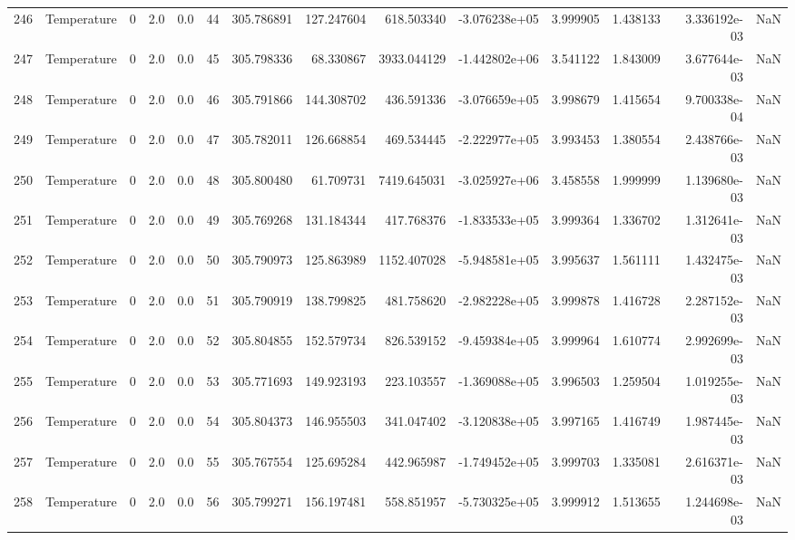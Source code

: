 \begin{tabular}{llrrrrrrrrrrrr}
246 &  Temperature &       0 &  2.0 &  0.0 &   44 &  305.786891 &   127.247604 &     618.503340 & -3.076238e+05 &  3.999905 &  1.438133 &  3.336192e-03 &      NaN \\
247 &  Temperature &       0 &  2.0 &  0.0 &   45 &  305.798336 &    68.330867 &    3933.044129 & -1.442802e+06 &  3.541122 &  1.843009 &  3.677644e-03 &      NaN \\
248 &  Temperature &       0 &  2.0 &  0.0 &   46 &  305.791866 &   144.308702 &     436.591336 & -3.076659e+05 &  3.998679 &  1.415654 &  9.700338e-04 &      NaN \\
249 &  Temperature &       0 &  2.0 &  0.0 &   47 &  305.782011 &   126.668854 &     469.534445 & -2.222977e+05 &  3.993453 &  1.380554 &  2.438766e-03 &      NaN \\
250 &  Temperature &       0 &  2.0 &  0.0 &   48 &  305.800480 &    61.709731 &    7419.645031 & -3.025927e+06 &  3.458558 &  1.999999 &  1.139680e-03 &      NaN \\
251 &  Temperature &       0 &  2.0 &  0.0 &   49 &  305.769268 &   131.184344 &     417.768376 & -1.833533e+05 &  3.999364 &  1.336702 &  1.312641e-03 &      NaN \\
252 &  Temperature &       0 &  2.0 &  0.0 &   50 &  305.790973 &   125.863989 &    1152.407028 & -5.948581e+05 &  3.995637 &  1.561111 &  1.432475e-03 &      NaN \\
253 &  Temperature &       0 &  2.0 &  0.0 &   51 &  305.790919 &   138.799825 &     481.758620 & -2.982228e+05 &  3.999878 &  1.416728 &  2.287152e-03 &      NaN \\
254 &  Temperature &       0 &  2.0 &  0.0 &   52 &  305.804855 &   152.579734 &     826.539152 & -9.459384e+05 &  3.999964 &  1.610774 &  2.992699e-03 &      NaN \\
255 &  Temperature &       0 &  2.0 &  0.0 &   53 &  305.771693 &   149.923193 &     223.103557 & -1.369088e+05 &  3.996503 &  1.259504 &  1.019255e-03 &      NaN \\
256 &  Temperature &       0 &  2.0 &  0.0 &   54 &  305.804373 &   146.955503 &     341.047402 & -3.120838e+05 &  3.997165 &  1.416749 &  1.987445e-03 &      NaN \\
257 &  Temperature &       0 &  2.0 &  0.0 &   55 &  305.767554 &   125.695284 &     442.965987 & -1.749452e+05 &  3.999703 &  1.335081 &  2.616371e-03 &      NaN \\
258 &  Temperature &       0 &  2.0 &  0.0 &   56 &  305.799271 &   156.197481 &     558.851957 & -5.730325e+05 &  3.999912 &  1.513655 &  1.244698e-03 &      NaN \\

\end{tabular}
